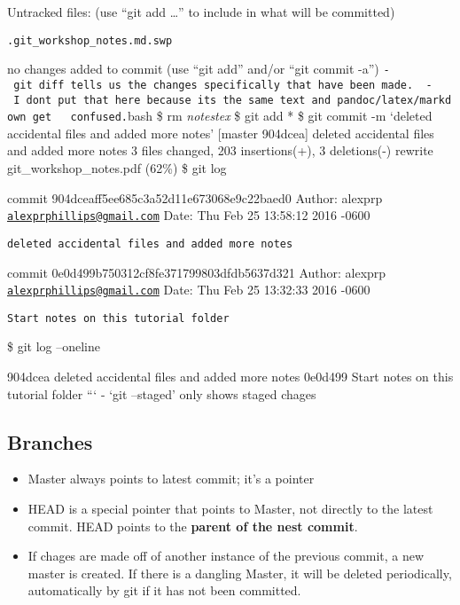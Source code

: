 \documentclass[10pt,]{article}
\providecommand{\tightlist}{%
  \setlength{\itemsep}{0pt}\setlength{\parskip}{0pt}}
\begin{document}
Untracked files: (use ``git add \ldots{}'' to include in what will be
committed)

\begin{verbatim}
.git_workshop_notes.md.swp
\end{verbatim}

no changes added to commit (use ``git add'' and/or ``git commit -a'')
\texttt{-\ git\ diff\ tells\ us\ the\ changes\ specifically\ that\ have\ been\ made.\ \ -\ I\ don\textquotesingle{}t\ put\ that\ here\ because\ it\textquotesingle{}s\ the\ same\ text\ and\ pandoc/latex/markdown\ get\ \ \ confused.}bash
\$ rm \emph{notestex} \$ git add * \$ git commit -m `deleted accidental
files and added more notes' {[}master 904dcea{]} deleted accidental
files and added more notes 3 files changed, 203 insertions(+), 3
deletions(-) rewrite git\_workshop\_notes.pdf (62\%) \$ git log

commit 904dceaff5ee685c3a52d11e673068e9c22baed0 Author: alexprp
\href{mailto:alexprphillips@gmail.com}{\nolinkurl{alexprphillips@gmail.com}}
Date: Thu Feb 25 13:58:12 2016 -0600

\begin{verbatim}
deleted accidental files and added more notes
\end{verbatim}

commit 0e0d499b750312cf8fe371799803dfdb5637d321 Author: alexprp
\href{mailto:alexprphillips@gmail.com}{\nolinkurl{alexprphillips@gmail.com}}
Date: Thu Feb 25 13:32:33 2016 -0600

\begin{verbatim}
Start notes on this tutorial folder
\end{verbatim}

\$ git log --oneline

904dcea deleted accidental files and added more notes 0e0d499 Start
notes on this tutorial folder ``` - `git --staged' only shows staged
chages

\subsection{Branches}\label{branches}

\begin{itemize}
\tightlist
\item
  Master always points to latest commit; it's a pointer
\item
  HEAD is a special pointer that points to Master, not directly to the
  latest commit. HEAD points to the \textbf{parent of the nest commit}.
\item
  If chages are made off of another instance of the previous commit, a
  new master is created. If there is a dangling Master, it will be
  deleted periodically, automatically by git if it has not been
  committed.
\end{itemize}
\end{document}
